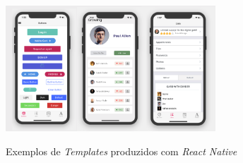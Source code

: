 \begin{figure}[H]
	\centering
	\caption{Exemplos de \textit{Templates} produzidos com \textit{React Native}}
	\includegraphics[width=0.7\textwidth]{figuras/react_native_elements.png}
	\label{fig:react-native}
\end{figure} 

